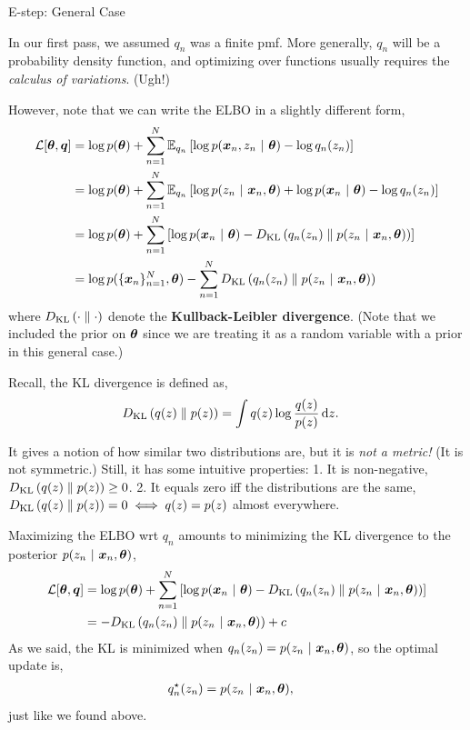\documentclass[aspectratio=169]{beamer}
\begin{document}
\begin{frame}[t, allowframebreaks]{E-step: General Case}\label{e-step-general-case}

In our first pass, we assumed \(q_n\) was a finite pmf. More generally,
\(q_n\) will be a probability density function, and optimizing over
functions usually requires the \emph{calculus of variations}. (Ugh!)

However, note that we can write the ELBO in a slightly different form,
\begin{align*}
    \mathcal{L}[\boldsymbol{\theta}, \boldsymbol{q}] 
    &= \log p(\boldsymbol{\theta}) + \sum_{n=1}^N  \mathbb{E}_{q_n} \left[\log p(\boldsymbol{x}_n, z_n ~\vert~ \boldsymbol{\theta}) - \log q_n(z_n) \right] \\
    &= \log p(\boldsymbol{\theta}) + \sum_{n=1}^N  \mathbb{E}_{q_n} \left[\log p(z_n ~\vert~ \boldsymbol{x}_n, \boldsymbol{\theta}) + \log p(\boldsymbol{x}_n ~\vert~ \boldsymbol{\theta}) - \log q_n(z_n) \right] \\
    &= \log p(\boldsymbol{\theta}) + \sum_{n=1}^N  \left[\log p(\boldsymbol{x}_n ~\vert~ \boldsymbol{\theta}) -D_{\textrm{KL}}\left(q_n(z_n)\;\|\;p(z_n ~\vert~ \boldsymbol{x}_n, \boldsymbol{\theta})\right) \right] \\
    &= \log p(\{\boldsymbol{x}_n\}_{n=1}^N, \boldsymbol{\theta}) - \sum_{n=1}^N  D_{\textrm{KL}}\left(q_n(z_n)\;\|\;p(z_n ~\vert~ \boldsymbol{x}_n, \boldsymbol{\theta})\right)
\end{align*} where \(D_{\textrm{KL}}\left(\cdot\;\|\;\cdot\right)\) denote the
\textbf{Kullback-Leibler divergence}. (Note that we included the prior
on \(\boldsymbol{\theta}\) since we are treating it as a random variable with a
prior in this general case.)

Recall, the KL divergence is defined as, \begin{align*}
    D_{\textrm{KL}}\left(q(z)\;\|\;p(z)\right) &= \int q(z) \log \frac{q(z)}{p(z)} \mathop{}\!\mathrm{d} z.
\end{align*}

It gives a notion of how similar two distributions are, but it is
\emph{not a metric!} (It is not symmetric.) Still, it has some intuitive
properties: 1. It is non-negative, \(D_{\textrm{KL}}\left(q(z)\;\|\;p(z)\right) \geq 0\). 2. It
equals zero iff the distributions are the same,
\(D_{\textrm{KL}}\left(q(z)\;\|\;p(z)\right) = 0 \iff q(z) = p(z)\) almost everywhere.

Maximizing the ELBO wrt \(q_n\) amounts to minimizing the KL divergence
to the posterior \(p(z_n ~\vert~ \boldsymbol{x}_n, \boldsymbol{\theta})\), \begin{align*}
    \mathcal{L}[\boldsymbol{\theta}, \boldsymbol{q}] 
    &= \log p(\boldsymbol{\theta}) + \sum_{n=1}^N  \left[\log p(\boldsymbol{x}_n ~\vert~ \boldsymbol{\theta}) -D_{\textrm{KL}}\left(q_n(z_n)\;\|\;p(z_n ~\vert~ \boldsymbol{x}_n, \boldsymbol{\theta})\right) \right] \\
    &= -D_{\textrm{KL}}\left(q_n(z_n)\;\|\;p(z_n ~\vert~ \boldsymbol{x}_n, \boldsymbol{\theta})\right) + c
\end{align*} As we said, the KL is minimized when
\(q_n(z_n) = p(z_n ~\vert~ \boldsymbol{x}_n, \boldsymbol{\theta})\), so the optimal update is,
\begin{align*}
    q_n^\star(z_n) &= p(z_n ~\vert~ \boldsymbol{x}_n, \boldsymbol{\theta}),
\end{align*} just like we found above.
\end{frame}
\end{document}
